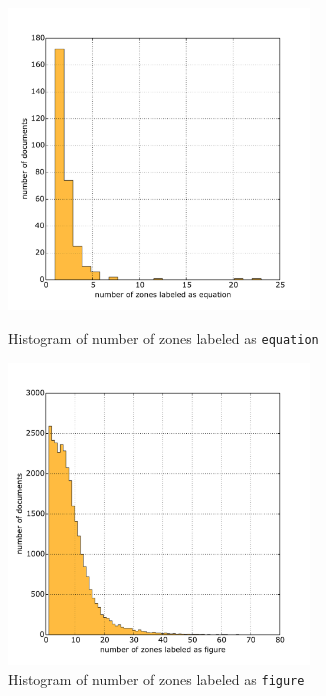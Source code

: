   \begin{figure}
\centering
\begin{minipage}[t!]{0.48\linewidth}
  \includegraphics[width=8cm]{plots/equation_histogram}
  \caption{Histogram of number of zones labeled as \texttt{equation}}
  \label{fig:equation_histogram}
\end{minipage}
\quad
\begin{minipage}[t!]{0.48\linewidth}
  \includegraphics[width=8cm]{plots/figure_histogram}
  \caption{Histogram of number of zones labeled as \texttt{figure}}
  \label{fig:figure_histogram}
\end{minipage}
\end{figure}

